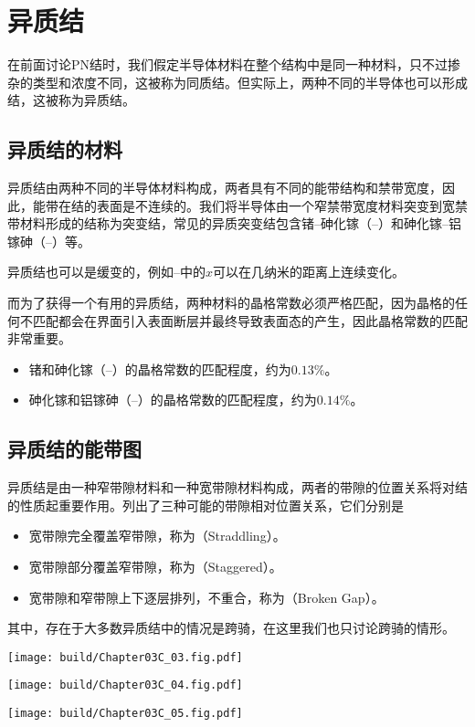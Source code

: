 \section{异质结}
在前面讨论PN结时，我们假定半导体材料在整个结构中是同一种材料，只不过掺杂的类型和浓度不同，这被称为同质结。但实际上，两种不同的半导体也可以形成结，这被称为异质结。

\subsection{异质结的材料}
异质结由两种不同的半导体材料构成，两者具有不同的能带结构和禁带宽度，因此，能带在结的表面是不连续的。我们将半导体由一个窄禁带宽度材料突变到宽禁带材料形成的结称为突变结，常见的异质突变结包含锗--砷化镓（--）和砷化镓--铝镓砷（--）等。

异质结也可以是缓变的，例如--中的$x$可以在几纳米的距离上连续变化。

而为了获得一个有用的异质结，两种材料的晶格常数必须严格匹配，因为晶格的任何不匹配都会在界面引入表面断层并最终导致表面态的产生，因此晶格常数的匹配非常重要。
\begin{itemize}
    \item 锗和砷化镓（--）的晶格常数的匹配程度，约为$0.13\%$。
    \item 砷化镓和铝镓砷（--）的晶格常数的匹配程度，约为$0.14\%$。
\end{itemize}

\subsection{异质结的能带图}

异质结是由一种窄带隙材料和一种宽带隙材料构成，两者的带隙的位置关系将对结的性质起重要作用。列出了三种可能的带隙相对位置关系，它们分别是
\begin{itemize}
    \item 宽带隙完全覆盖窄带隙，称为（Straddling）。
    \item 宽带隙部分覆盖窄带隙，称为（Staggered）。
    \item 宽带隙和窄带隙上下逐层排列，不重合，称为（Broken Gap）。
\end{itemize}
其中，存在于大多数异质结中的情况是跨骑，在这里我们也只讨论跨骑的情形。

\begin{Figure}[异质结的三种能带关系]
    \begin{FigureSub}[跨骑（Straddling）;跨骑]
        \texttt{[image: build/Chapter03C\_03.fig.pdf]}
    \end{FigureSub}
    \begin{FigureSub}[交错（Staggered）;交错]
        \texttt{[image: build/Chapter03C\_04.fig.pdf]}
    \end{FigureSub}
    \begin{FigureSub}
        \texttt{[image: build/Chapter03C\_05.fig.pdf]}
    \end{FigureSub}
\end{Figure}

